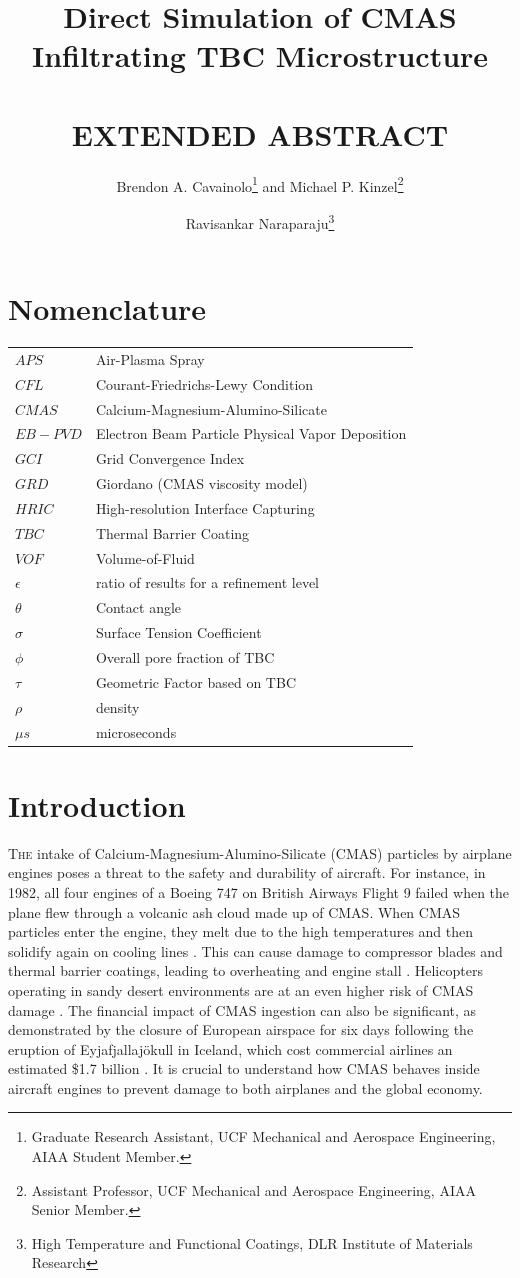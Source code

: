 \documentclass[conf]{new-aiaa}
\title{Direct Simulation of CMAS Infiltrating TBC Microstructure \\
\\
\textbf{EXTENDED ABSTRACT}}
\author{Brendon A. Cavainolo\footnote{Graduate Research Assistant, UCF Mechanical and Aerospace Engineering, AIAA Student Member.} and Michael P. Kinzel\footnote{Assistant Professor, UCF Mechanical and Aerospace Engineering, AIAA Senior Member.}}
\affil{University of Central Florida (UCF), Orlando, FL, 32816, United States}
\author{Ravisankar Naraparaju\footnote{High Temperature and Functional Coatings, DLR Institute of Materials Research}}
\affil{German Aerospace Center (DLR), Cologne, 51147. Germany}
\begin{document}
\section{Nomenclature}
{\renewcommand\arraystretch{1.0}
\noindent\begin{longtable*}{@{}l @{\quad=\quad} l@{}}
$APS$  & Air-Plasma Spray \\
$CFL$   & Courant-Friedrichs-Lewy Condition \\
$CMAS$  & Calcium-Magnesium-Alumino-Silicate \\
$EB-PVD$ &    Electron Beam Particle Physical Vapor Deposition \\
$GCI$ & Grid Convergence Index \\
$GRD$ & Giordano (CMAS viscosity model) \\
$HRIC$ & High-resolution Interface Capturing \\
$TBC$ & Thermal Barrier Coating \\
$VOF$ & Volume-of-Fluid \\
$\epsilon$ & ratio of results for a refinement level \\
$\theta$ & Contact angle \\
$\sigma$   & Surface Tension Coefficient \\
$\phi$ & Overall pore fraction of TBC \\
$\tau$ & Geometric Factor based on TBC \\
$\rho$ & density \\
$\mu s$ & microseconds
\end{longtable*}}

\section{Introduction}
\lettrine{T}{he} intake of Calcium-Magnesium-Alumino-Silicate (CMAS) particles by airplane engines poses a threat to the safety and durability of aircraft. For instance, in 1982, all four engines of a Boeing 747 on British Airways Flight 9 failed when the plane flew through a volcanic ash cloud made up of CMAS. When CMAS particles enter the engine, they melt due to the high temperatures and then solidify again on cooling lines \cite{Chen2015}. This can cause damage to compressor blades and thermal barrier coatings, leading to overheating and engine stall \cite{Chen2015}. Helicopters operating in sandy desert environments are at an even higher risk of CMAS damage \cite{Smialek}. The financial impact of CMAS ingestion can also be significant, as demonstrated by the closure of European airspace for six days following the eruption of Eyjafjallajökull in Iceland, which cost commercial airlines an estimated \$1.7 billion \cite{Thehumanconditionblog_2010}. It is crucial to understand how CMAS behaves inside aircraft engines to prevent damage to both airplanes and the global economy.
\end{document}
